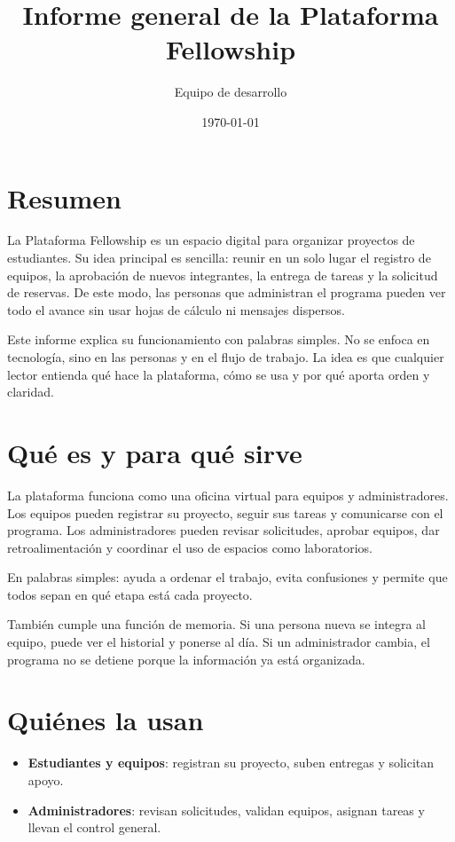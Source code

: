 \documentclass[12pt]{article}
\title{Informe general de la Plataforma Fellowship}
\author{Equipo de desarrollo}
\date{\today}
\begin{document}
\maketitle
\tableofcontents
\newpage

\section{Resumen}
La Plataforma Fellowship es un espacio digital para organizar proyectos de estudiantes. Su idea principal es sencilla: reunir en un solo lugar el registro de equipos, la aprobación de nuevos integrantes, la entrega de tareas y la solicitud de reservas. De este modo, las personas que administran el programa pueden ver todo el avance sin usar hojas de cálculo ni mensajes dispersos.

Este informe explica su funcionamiento con palabras simples. No se enfoca en tecnología, sino en las personas y en el flujo de trabajo. La idea es que cualquier lector entienda qué hace la plataforma, cómo se usa y por qué aporta orden y claridad.

\section{Qué es y para qué sirve}
La plataforma funciona como una oficina virtual para equipos y administradores. Los equipos pueden registrar su proyecto, seguir sus tareas y comunicarse con el programa. Los administradores pueden revisar solicitudes, aprobar equipos, dar retroalimentación y coordinar el uso de espacios como laboratorios.

En palabras simples: ayuda a ordenar el trabajo, evita confusiones y permite que todos sepan en qué etapa está cada proyecto.

También cumple una función de memoria. Si una persona nueva se integra al equipo, puede ver el historial y ponerse al día. Si un administrador cambia, el programa no se detiene porque la información ya está organizada.

\section{Quiénes la usan}
\begin{itemize}
  \item \textbf{Estudiantes y equipos}: registran su proyecto, suben entregas y solicitan apoyo.
  \item \textbf{Administradores}: revisan solicitudes, validan equipos, asignan tareas y llevan el control general.
\end{itemize}
\end{document}
